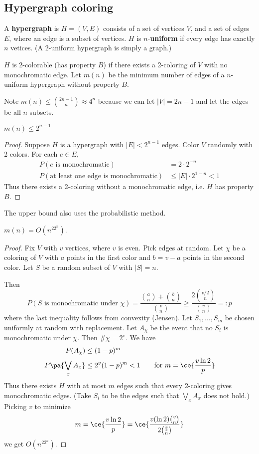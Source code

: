 \subsection{Hypergraph coloring}
\begin{df}
A \textbf{hypergraph} is $H=(V,E)$ consists of a set of vertices $V$, and a set of edges $E$, where an edge is a subset of vertices. $H$ is $n$-\textbf{uniform} if every edge has exactly $n$ vetices. (A 2-uniform hypergraph is simply a graph.)

$H$ is 2-colorable (has property $B$) if there exists a 2-coloring of $V$ with no monochromatic edge. Let $m(n)$ be the minimum number of edges of a $n$-uniform hypergraph without property $B$. 
\end{df}

Note $m(n)\leq \binom{2n-1}{n}\approx 4^n$ because we can let $|V|=2n-1$ and let the edges be all $n$-subsets.
\begin{pr}
$m(n)\leq 2^{n-1}$
\end{pr}
\begin{proof}
Suppose $H$ is a hypergraph with $|E|<2^{n-1}$ edges. Color $V$ randomly with 2 colors. For each $e\in E$, 
\begin{align*}
P(e\text{ is monochromatic})&=2\cdot 2^{-n}\\
P(\text{at least one edge is monochromatic})&\leq |E|\cdot 2^{1-n}<1
\end{align*}
Thus there exists a 2-coloring without a monochromatic edge, i.e. $H$ has property $B$.
\end{proof}
The upper bound also uses the probabilistic method.
\begin{thm}
$m(n)=O(n^22^n)$.
\end{thm}
\begin{proof}
Fix $V$ with $v$ vertices, where $v$ is even. Pick edges at random. Let $\chi$ be a coloring of $V$ with $a$ points in the first color and $b=v-a$ points in the second color. Let $S$ be a random subset of $V$ with $|S|=n$.

Then
\[
P(S\text{ is monochromatic under }\chi)=\frac{\binom an+\binom bn}{\binom vn}\geq \frac{2\binom{v/2}{n}}{\binom vn}=:p
\]
where the last inequality follows from convexity (Jensen). Let $S_1,\ldots, S_m$ be chosen uniformly at random with replacement. Let $A_{\chi}$ be the event that no $S_i$ is monochromatic under $\chi$. Then $\#\chi=2^v$. We have
\begin{align*}
P(A_{\chi})&\leq (1-p)^m\\
P\pa{\bigvee_x A_x}&\leq 2^v (1-p)^m<1 \qquad \text{for }m=\ce{\frac{v\ln 2}{p}}
\end{align*}
Thus there exists $H$ with at most $m$ edges such that every 2-coloring gives monochromatic edges. (Take $S_i$ to be the edges such that $\bigvee_x A_x$ does not hold.) Picking $v$ to minimize
\[
m=\ce{\frac{v\ln 2}{p}}=\ce{\frac{v(\ln 2)\binom vn}{2\binom{\frac v2}{n}}}
\]
we get  $O(n^22^n)$.
\end{proof}
